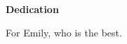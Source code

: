 \begin{center}
  \textbf{Dedication}

  For Emily, who is the best.
\end{center}


\cleardoublepage

